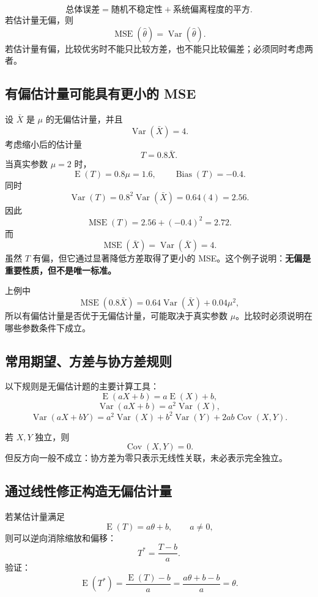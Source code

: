 \documentclass[11pt,a4paper]{article}
\newcommand{\E}{\operatorname{E}}
\newcommand{\Var}{\operatorname{Var}}
\newcommand{\Cov}{\operatorname{Cov}}
\newcommand{\Bias}{\operatorname{Bias}}
\newcommand{\MSE}{\operatorname{MSE}}
\begin{document}
\begin{conceptbox}[分解的含义]
\[
  \text{总体误差}
  =
  \text{随机不稳定性}
  +
  \text{系统偏离程度的平方}.
\]
若估计量无偏，则
\[
  \MSE(\hat\theta)=\Var(\hat\theta).
\]
若估计量有偏，比较优劣时不能只比较方差，也不能只比较偏差；必须同时考虑两者。
\end{conceptbox}

\subsection{有偏估计量可能具有更小的 MSE}

\begin{examplebox}[偏差--方差权衡]
设 $\bar X$ 是 $\mu$ 的无偏估计量，并且
\[
  \Var(\bar X)=4.
\]
考虑缩小后的估计量
\[
  T=0.8\bar X.
\]
当真实参数 $\mu=2$ 时，
\[
  \E(T)=0.8\mu=1.6,
  \qquad
  \Bias(T)=-0.4.
\]
同时
\[
  \Var(T)=0.8^2\Var(\bar X)=0.64(4)=2.56.
\]
因此
\[
  \MSE(T)=2.56+(-0.4)^2=2.72.
\]
而
\[
  \MSE(\bar X)=\Var(\bar X)=4.
\]
虽然 $T$ 有偏，但它通过显著降低方差取得了更小的 MSE。这个例子说明：\textbf{无偏是重要性质，但不是唯一标准。}
\end{examplebox}

\begin{warnbox}
上例中
\[
  \MSE(0.8\bar X)
  =
  0.64\Var(\bar X)+0.04\mu^2,
\]
所以有偏估计量是否优于无偏估计量，可能取决于真实参数 $\mu$。比较时必须说明在哪些参数条件下成立。
\end{warnbox}

\subsection{常用期望、方差与协方差规则}

以下规则是无偏估计题的主要计算工具：
\[
  \E(aX+b)=a\E(X)+b,
\]
\[
  \Var(aX+b)=a^2\Var(X),
\]
\[
  \Var(aX+bY)
  =
  a^2\Var(X)
  +
  b^2\Var(Y)
  +
  2ab\Cov(X,Y).
\]

若 $X,Y$ 独立，则
\[
  \Cov(X,Y)=0.
\]
但反方向一般不成立：协方差为零只表示无线性关联，未必表示完全独立。

\subsection{通过线性修正构造无偏估计量}

若某估计量满足
\[
  \E(T)=a\theta+b,
  \qquad a\ne0,
\]
则可以逆向消除缩放和偏移：
\[
  \boxed{
  T^*=\frac{T-b}{a}.
  }
\]
验证：
\[
  \E(T^*)
  =
  \frac{\E(T)-b}{a}
  =
  \frac{a\theta+b-b}{a}
  =
  \theta.
\]
\end{document}
